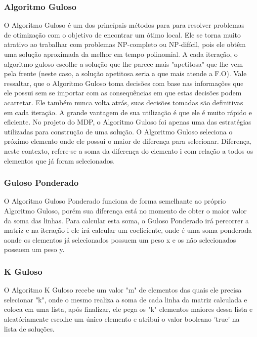 \documentclass[12pt]{article}
\begin{document}
\subsubsection{Algoritmo Guloso}

O Algoritmo Guloso é um dos princípais métodos para para resolver problemas de otimização com o objetivo de encontrar um ótimo local. Ele se torna muito atrativo ao trabalhar com problemas NP-completo ou NP-difícil, pois ele obtêm uma solução aproximada da melhor em tempo polinomial. A cada iteração, o algoritmo guloso escolhe a solução que lhe parece mais "apetitosa" que lhe vem pela frente (neste caso, a solução apetitosa seria a que mais atende a F.O). Vale ressaltar, que o Algoritmo Guloso toma decisões com base nas informações que ele possui sem se importar com as consequências em que estas decisões podem acarretar. Ele também nunca volta atrás, suas decisões tomadas são definitivas em cada iteração. A grande vantagem de sua utilização é que ele é muito rápido e eficiente. No projeto do MDP, o Algoritmo Guloso foi apenas uma das estratégias utilizadas para construção de uma solução. O Algoritmo Guloso seleciona o próximo elemento onde ele possui o maior de diferença para selecionar. Diferença, neste contexto, refere-se a soma da diferença do elemento i com relação a todos os elementos que já foram selecionados.

\subsubsection{Guloso Ponderado}

O Algoritmo Guloso Ponderado funciona de forma semelhante ao próprio Algoritmo Guloso, porém sua diferença está no momento de obter o maior valor da soma das linhas. Para calcular esta soma, o Guloso Ponderado irá percorrer a matriz e na iteração i ele irá calcular um coeficiente, onde é uma soma ponderada aonde os elementos já selecionados possuem um peso x e os não selecionados possuem um peso y.  

\subsubsection{K Guloso}

O Algoritmo K Guloso recebe um valor "m" de elementos das quais ele precisa selecionar "k", onde o mesmo realiza a soma de cada linha da matriz calculada e coloca em uma lista, após finalizar, ele pega os "k" elementos maiores dessa lista e aleatóriamente escolhe um único elemento e atribui o valor booleano 'true' na lista de soluções.
\end{document}
